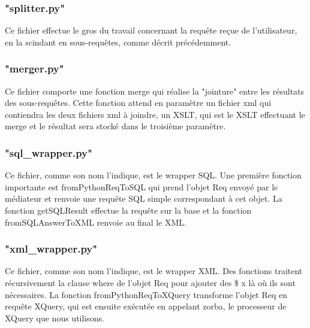 \subsubsection{"splitter.py"}
Ce fichier effectue le gros du travail concernant la requête reçue de l'utilisateur, en la scindant en sous-requêtes, comme décrit précédemment.

\subsubsection{"merger.py"}
Ce fichier comporte une fonction merge qui réalise la "jointure" entre les résultats des sous-requêtes. Cette fonction attend en paramètre un fichier xml qui contiendra les deux fichiers xml à joindre, un XSLT, qui est le XSLT effectuant le merge et le résultat sera stocké dans le troisième paramètre.

\subsubsection{"sql\_wrapper.py"}
Ce fichier, comme son nom l'indique, est le wrapper SQL. Une première fonction importante est fromPythonReqToSQL qui prend l'objet Req envoyé par le médiateur et renvoie une requête SQL simple correspondant à cet objet.  La fonction getSQLResult effectue la requête sur la base et la fonction fromSQLAnswerToXML renvoie au final le XML.

\subsubsection{"xml\_wrapper.py"}
Ce fichier, comme son nom l'indique, est le wrapper XML. Des fonctions traitent récursivement la clause where de l'objet Req pour ajouter des \$ x là où ils sont nécessaires. La fonction fromPythonReqToXQuery transforme l'objet Req en requête XQuery, qui est ensuite exécutée en appelant zorba, le processeur de XQuery que nous utilisons.
